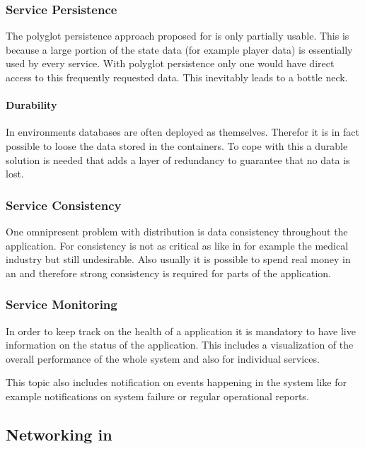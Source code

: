 \subsubsection{Service Persistence}

The polyglot persistence approach proposed for \mss{} is only partially usable.
This is because a large portion of the state data (for example player data)
is essentially used by every service. With polyglot persistence only one
\ms{} would have direct access to this frequently requested data. This
inevitably leads to a bottle neck.

\paragraph{Durability}

In \ms{} environments databases are often deployed as \mss{} themselves.
Therefor it is in fact possible to loose the data stored in the containers. To
cope with this a durable solution is needed that adds a layer of redundancy to
guarantee that no data is lost. 

\subsubsection{Service Consistency}

One omnipresent problem with distribution is data consistency throughout the
application. For \ogs{} consistency is not as critical as like in for example
the medical industry but still undesirable. Also usually it is possible to spend
real money in an \og{} and therefore strong consistency is required for parts of
the application. 

\subsubsection{Service Monitoring}

In order to keep track on the health of a \ms{} application it is mandatory to
have live information on the status of the application. This includes a
visualization of the overall performance of the whole system and also for
individual services.

This topic also includes notification on events happening in the system like for
example notifications on system failure or regular operational reports. 

\subsection{Networking in \ogs{}}

